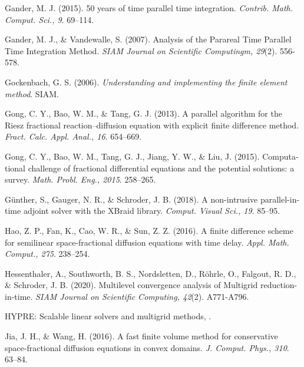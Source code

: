 \begin{latin}
\begin{thebibliography}{99}
Gander, M. J.
(2015).
50 years of time parallel time integration.
\textit{Contrib. Math. Comput. Sci., 9}.
69–114.

Gander, M. J., \& Vandewalle, S.
(2007).
Analysis of the Parareal Time Parallel Time Integration Method.
\textit{SIAM Journal on Scientific Computingm, 29}(2).
556-578.

Gockenbach, G. S.
(2006).
\textit{Understanding and implementing the finite element method}.
SIAM.

Gong, C. Y., Bao, W. M., \& Tang, G. J.
(2013).
A parallel algorithm for the Riesz fractional reaction–diffusion equation with explicit finite difference method.
\textit{Fract. Calc. Appl. Anal., 16}.
654–669.

Gong, C. Y., Bao, W. M., Tang, G. J., Jiang, Y. W., \& Liu, J.
(2015).
Computational challenge of fractional differential equations and the potential solutions: a survey.
\textit{Math. Probl. Eng., 2015}.
258–265.

Günther, S., Gauger, N. R., \&  Schroder, J. B.
(2018).
A non-intrusive parallel-in-time adjoint solver with the XBraid library.
\textit{Comput. Visual Sci., 19}.
85–95.

Hao, Z. P., Fan, K., Cao, W. R., \& Sun, Z. Z. 
(2016).
A finite difference scheme for semilinear space-fractional diffusion equations with time delay.
\textit{Appl. Math. Comput., 275}.
238–254.

Hessenthaler, A., Southworth, B. S., Nordsletten, D., R\"{o}hrle, O., Falgout, R. D., \& Schroder, J. B.
(2020).
Multilevel convergence analysis of Multigrid reduction-in-time.
\textit{SIAM Journal on Scientific Computing, 42}(2).
A771-A796.

HYPRE: Scalable linear solvers and multigrid methods, 
\href{https://llnl.gov/casc/hypre}{}.

Jia, J. H., \& Wang, H.
(2016).
A fast finite volume method for conservative space-fractional diffusion equations in convex domains.
\textit{J. Comput. Phys., 310}.
63–84.


\end{thebibliography}
\end{latin}
